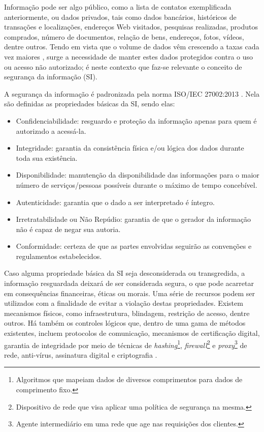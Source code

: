 \documentclass[a4paper,10pt,oneside,conference,final,keeplastbox]{inatel}
\newcommand{\web}{Web\xspace}
\begin{document}
            Informação pode ser algo público, como a lista de contatos exemplificada anteriormente, ou dados privados, tais como dados bancários, históricos de transações e localizações, endereços \web visitados, pesquisas realizadas, produtos comprados, número de documentos, relação de bens, endereços, fotos, vídeos, dentre outros. Tendo em vista que o volume de dados vêm crescendo a taxas cada vez maiores \cite{weekly2017volume}, surge a necessidade de manter estes dados protegidos contra o uso ou acesso não autorizado; é neste contexto que faz-se relevante o conceito de segurança da informação (SI).
            
            A segurança da informação é padronizada pela norma ISO/IEC 27002:2013 \cite{iso2013si}. Nela são definidas as propriedades básicas da SI, sendo elas:
            
            \begin{itemize}
                \item Confidenciabilidade: resguardo e proteção da informação apenas para quem é autorizado a acessá-la.
                \item Integridade: garantia da consistência física e/ou lógica dos dados durante toda sua existência.
                \item Disponibilidade: manutenção da disponibilidade das informações para o maior número de serviços/pessoas possíveis durante o máximo de tempo concebível.
                \item Autenticidade: garantia que o dado a ser interpretado é íntegro.
                \item Irretratabilidade ou Não Repúdio: garantia de que o gerador da informação não é capaz de negar sua autoria.
                \item Conformidade: certeza de que as partes envolvidas seguirão as convenções e regulamentos estabelecidos.
            \end{itemize}
            
            Caso alguma propriedade básica da SI seja desconsiderada ou transgredida, a informação resguardada deixará de ser considerada segura, o que pode acarretar em consequências financeiras, éticas ou morais. Uma série de recursos podem ser utilizados com a finalidade de evitar a violação destas propriedades. Existem mecanismos físicos, como infraestrutura, blindagem, restrição de acesso, dentre outros. Há também os controles lógicos que, dentro de uma gama de métodos existentes, incluem protocolos de comunicação, mecanismos de certificação digital, garantia de integridade por meio de técnicas de \textit{hashing}\footnote{Algoritmos que mapeiam dados de diversos comprimentos para dados de comprimento fixo.}, \textit{firewall}\footnote{Dispositivo de rede que visa aplicar uma política de segurança na mesma.} e \textit{proxy}\footnote{Agente intermediário em uma rede que age nas requisições dos clientes.} de rede, anti-vírus, assinatura digital e criptografia \cite{saint2005information}.
            
\end{document}
